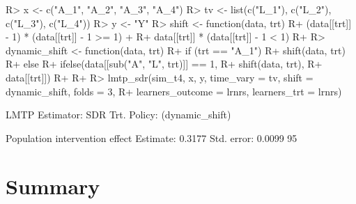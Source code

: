 \documentclass[twoside,11pt]{article}
\newenvironment{CodeChunk}{}{}
\begin{document}
\begin{CodeChunk}
\begin{CodeInput}
R> x <- c("A_1", "A_2", "A_3", "A_4")
R> tv <- list(c("L_1"), c("L_2"), c("L_3"), c("L_4"))
R> y <- "Y"
R> shift <- function(data, trt) {
R+   (data[[trt]] - 1) * (data[[trt]] - 1 >= 1) + 
R+     data[[trt]] * (data[[trt]] - 1 < 1)
R+ }
R> dynamic_shift <- function(data, trt) {
R+   if (trt == "A_1") {
R+     shift(data, trt)
R+   } else {
R+     ifelse(data[[sub("A", "L", trt)]] == 1, 
R+            shift(data, trt),
R+            data[[trt]])
R+   }
R+ }
R> lmtp_sdr(sim_t4, x, y, time_vary = tv, shift = dynamic_shift, folds = 3, 
R+          learners_outcome = lrnrs, learners_trt = lrnrs)
\end{CodeInput}

\begin{CodeOutput}
LMTP Estimator: SDR
   Trt. Policy: (dynamic_shift)

Population intervention effect
      Estimate: 0.3177
    Std. error: 0.0099
        95%
\end{CodeOutput}
\end{CodeChunk}

\hypertarget{summary}{\section{Summary}\label{summary}}

\newpage


\end{document}
